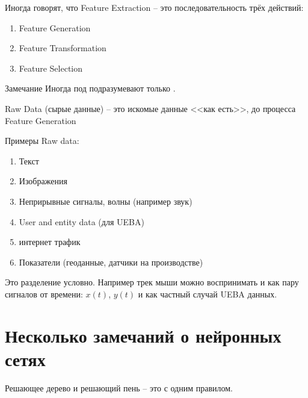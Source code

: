 \begin{frame}
	Иногда говорят, что Feature Extraction -- это последовательность трёх действий:
	\begin{enumerate}
		\item Feature Generation 
		\item Feature Transformation 
		\item Feature Selection
	\end{enumerate}
	
	\begin{block}{Замечание}
	Иногда под 
	подразумевают только .
	\end{block}
\end{frame}

\begin{frame}{Raw Data}
	 (сырые данные) -- это искомые данные <<как есть>>, до процесса
	Feature Generation
	
	Примеры Raw data:
	\begin{enumerate}
		\item Текст
		\item Изображения
		\item Неприрывные сигналы, волны (например звук)
		\item User and entity data (для UEBA)
		\item интернет трафик
		\item Показатели (геоданные, датчики на производстве) 
	\end{enumerate}
	
	Это разделение условно. Например трек мыши можно воспринимать и
	как пару сигналов от времени: $x(t)$, $y(t)$ и как частный случай
	UEBA данных.
\end{frame}

\section{Несколько замечаний о нейронных сетях}\label{section:neneural_network}


\begin{frame}{Решающее дерево и решающий пень}
	 -- это 
	 с одним правилом.
	
	
	
\end{frame}

